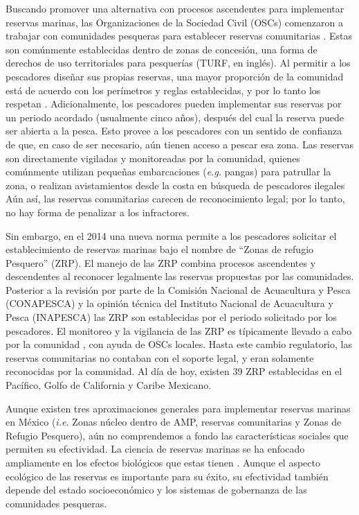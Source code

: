 \documentclass{frontiersSCNS}
\begin{document}
Buscando promover una alternativa con procesos ascendentes para
implementar reservas marinas, las Organizaciones de la Sociedad Civil
(OSCs) comenzaron a trabajar con comunidades pesqueras para establecer
reservas comunitarias \citep{uribe_2010-u2} . Estas son comúnmente
establecidas dentro de zonas de concesión, una forma de derechos de uso
territoriales para pesquerías (TURF, en inglés). Al permitir a los
pescadores diseñar sus propias reservas, una mayor proporción de la
comunidad está de acuerdo con los perímetros y reglas establecidas, y
por lo tanto los respetan
\citep{gelcich_2015-Gw,espinosaromero_2014-PY,beger_2004-Y8} .
Adicionalmente, los pescadores pueden implementar sus reservas por un
periodo acordado (usualmente cinco años), después del cual la reserva
puede ser abierta a la pesca. Esto provee a los pescadores con un
sentido de confianza de que, en caso de ser necesario, aún tienen acceso
a pescar esa zona. Las reservas son directamente vigiladas y
monitoreadas por la comunidad, quienes comúnmente utilizan pequeñas
embarcaciones (\emph{e.g.} pangas) para patrullar la zona, o realizan
avistamientos desde la costa en búsqueda de pescadores ilegales Aún así,
las reservas comunitarias carecen de reconocimiento legal; por lo tanto,
no hay forma de penalizar a los infractores.

Sin embargo, en el 2014 una nueva norma \citep{nom} permite a los
pescadores solicitar el establecimiento de reservas marinas bajo el
nombre de ``Zonas de refugio Pesquero'' (ZRP). El manejo de las ZRP
combina procesos ascendentes y descendentes al reconocer legalmente las
reservas propuestas por las comunidades. Posterior a la revisión por
parte de la Comisión Nacional de Acuacultura y Pesca (CONAPESCA) y la
opinión técnica del Instituto Nacional de Acuacultura y Pesca (INAPESCA)
las ZRP son establecidas por el periodo solicitado por los pescadores.
El monitoreo y la vigilancia de las ZRP es típicamente llevado a cabo
por la comunidad , con ayuda de OSCs locales. Hasta este cambio
regulatorio, las reservas comunitarias no contaban con el soporte legal,
y eran solamente reconocidas por la comunidad. Al día de hoy, existen 39
ZRP establecidas en el Pacífico, Golfo de California y Caribe Mexicano.

Aunque existen tres aproximaciones generales para implementar reservas
marinas en México (\emph{i.e.} Zonas núcleo dentro de AMP, reservas
comunitarias y Zonas de Refugio Pesquero), aún no comprendemos a fondo
las características sociales que permiten su efectividad. La ciencia de
reservas marinas se ha enfocado ampliamente en los efectos biológicos
que estas tienen
\citep{lester_2009-Ks,giakoumi_2017-V2,sala_2017-69,afflerbach_2014-HP,krueck_2017-J1}.
Aunque el aspecto ecológico de las reservas es importante para su éxito,
su efectividad también depende del estado socioeconómico y los sistemas
de gobernanza de las comunidades pesqueras.
\end{document}
